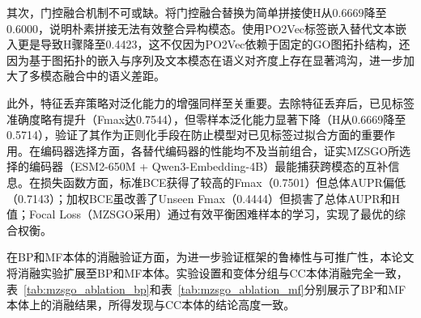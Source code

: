 其次，门控融合机制不可或缺。将门控融合替换为简单拼接使H从0.6669降至0.6000，说明朴素拼接无法有效整合异构模态。使用PO2Vec标签嵌入替代文本嵌入更是导致H骤降至0.4423，这不仅因为PO2Vec依赖于固定的GO图拓扑结构，还因为基于图拓扑的嵌入与序列及文本模态在语义对齐度上存在显著鸿沟，进一步加大了多模态融合中的语义差距。

此外，特征丢弃策略对泛化能力的增强同样至关重要。去除特征丢弃后，已见标签准确度略有提升（Fmax达0.7544），但零样本泛化能力显著下降（H从0.6669降至0.5714），验证了其作为正则化手段在防止模型对已见标签过拟合\cite{srivastava2014dropout}方面的重要作用。在编码器选择方面，各替代编码器的性能均不及当前组合，证实MZSGO所选择的编码器（ESM2-650M + Qwen3-Embedding-4B）最能捕获跨模态的互补信息。在损失函数方面，标准BCE获得了较高的Fmax（0.7501）但总体AUPR偏低（0.7143）；加权BCE虽改善了Unseen Fmax（0.4444）但损害了总体AUPR和H值；Focal Loss（MZSGO采用）通过有效平衡困难样本的学习，实现了最优的综合权衡。

在BP和MF本体的消融验证方面，为进一步验证框架的鲁棒性与可推广性，本论文将消融实验扩展至BP和MF本体。实验设置和变体分组与CC本体消融完全一致，表~\ref{tab:mzsgo_ablation_bp}和表~\ref{tab:mzsgo_ablation_mf}分别展示了BP和MF本体上的消融结果，所得发现与CC本体的结论高度一致。

